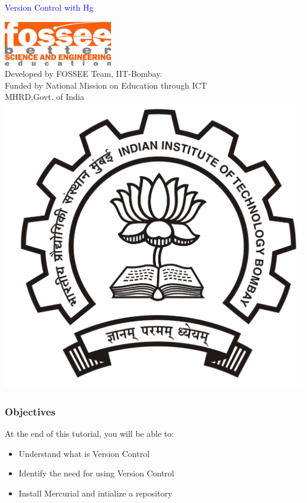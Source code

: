\documentclass[14pt,compress]{beamer}
\begin{document}
\begin{frame}
\begin{center}
\vspace{12pt}
\textcolor{blue}{\huge Version Control with Hg}
\end{center}
\vspace{18pt}
\begin{center}
\vspace{10pt}
\includegraphics[scale=0.95]{../images/fossee-logo.png}\\
\vspace{5pt}
\scriptsize Developed by FOSSEE Team, IIT-Bombay. \\ 
\scriptsize Funded by National Mission on Education through ICT\\
\scriptsize  MHRD,Govt. of India\\
\includegraphics[scale=0.15]{../images/iitb-logo.jpg}\\
\end{center}
\end{frame}

\begin{frame}
  \frametitle{Objectives}
  At the end of this tutorial, you will be able to:
  \begin{itemize}
  \item Understand what is Version Control
  \item Identify the need for using Version Control
  \item Install Mercurial and intialize a repository
  \end{itemize}
\end{frame}
\end{document}
